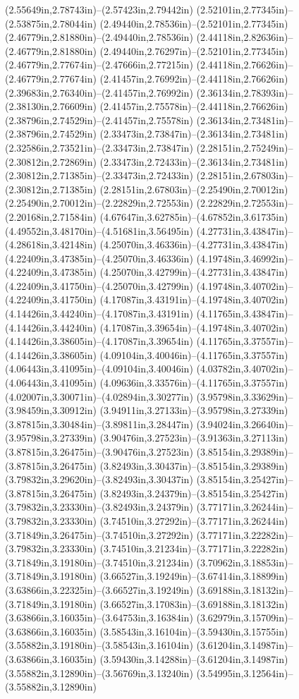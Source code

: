 (2.55649in,2.78743in)--(2.57423in,2.79442in) (2.52101in,2.77345in)--(2.53875in,2.78044in) (2.49440in,2.78536in)--(2.52101in,2.77345in) (2.46779in,2.81880in)--(2.49440in,2.78536in) (2.44118in,2.82636in)--(2.46779in,2.81880in) (2.49440in,2.76297in)--(2.52101in,2.77345in) (2.46779in,2.77674in)--(2.47666in,2.77215in) (2.44118in,2.76626in)--(2.46779in,2.77674in) (2.41457in,2.76992in)--(2.44118in,2.76626in) (2.39683in,2.76340in)--(2.41457in,2.76992in) (2.36134in,2.78393in)--(2.38130in,2.76609in) (2.41457in,2.75578in)--(2.44118in,2.76626in) (2.38796in,2.74529in)--(2.41457in,2.75578in) (2.36134in,2.73481in)--(2.38796in,2.74529in) (2.33473in,2.73847in)--(2.36134in,2.73481in) (2.32586in,2.73521in)--(2.33473in,2.73847in) (2.28151in,2.75249in)--(2.30812in,2.72869in) (2.33473in,2.72433in)--(2.36134in,2.73481in) (2.30812in,2.71385in)--(2.33473in,2.72433in) (2.28151in,2.67803in)--(2.30812in,2.71385in) (2.28151in,2.67803in)--(2.25490in,2.70012in) (2.25490in,2.70012in)--(2.22829in,2.72553in) (2.22829in,2.72553in)--(2.20168in,2.71584in) (4.67647in,3.62785in)--(4.67852in,3.61735in) (4.49552in,3.48170in)--(4.51681in,3.56495in) (4.27731in,3.43847in)--(4.28618in,3.42148in) (4.25070in,3.46336in)--(4.27731in,3.43847in) (4.22409in,3.47385in)--(4.25070in,3.46336in) (4.19748in,3.46992in)--(4.22409in,3.47385in) (4.25070in,3.42799in)--(4.27731in,3.43847in) (4.22409in,3.41750in)--(4.25070in,3.42799in) (4.19748in,3.40702in)--(4.22409in,3.41750in) (4.17087in,3.43191in)--(4.19748in,3.40702in) (4.14426in,3.44240in)--(4.17087in,3.43191in) (4.11765in,3.43847in)--(4.14426in,3.44240in) (4.17087in,3.39654in)--(4.19748in,3.40702in) (4.14426in,3.38605in)--(4.17087in,3.39654in) (4.11765in,3.37557in)--(4.14426in,3.38605in) (4.09104in,3.40046in)--(4.11765in,3.37557in) (4.06443in,3.41095in)--(4.09104in,3.40046in) (4.03782in,3.40702in)--(4.06443in,3.41095in) (4.09636in,3.33576in)--(4.11765in,3.37557in) (4.02007in,3.30071in)--(4.02894in,3.30277in) (3.95798in,3.33629in)--(3.98459in,3.30912in) (3.94911in,3.27133in)--(3.95798in,3.27339in) (3.87815in,3.30484in)--(3.89811in,3.28447in) (3.94024in,3.26640in)--(3.95798in,3.27339in) (3.90476in,3.27523in)--(3.91363in,3.27113in) (3.87815in,3.26475in)--(3.90476in,3.27523in) (3.85154in,3.29389in)--(3.87815in,3.26475in) (3.82493in,3.30437in)--(3.85154in,3.29389in) (3.79832in,3.29620in)--(3.82493in,3.30437in) (3.85154in,3.25427in)--(3.87815in,3.26475in) (3.82493in,3.24379in)--(3.85154in,3.25427in) (3.79832in,3.23330in)--(3.82493in,3.24379in) (3.77171in,3.26244in)--(3.79832in,3.23330in) (3.74510in,3.27292in)--(3.77171in,3.26244in) (3.71849in,3.26475in)--(3.74510in,3.27292in) (3.77171in,3.22282in)--(3.79832in,3.23330in) (3.74510in,3.21234in)--(3.77171in,3.22282in) (3.71849in,3.19180in)--(3.74510in,3.21234in) (3.70962in,3.18853in)--(3.71849in,3.19180in) (3.66527in,3.19249in)--(3.67414in,3.18899in) (3.63866in,3.22325in)--(3.66527in,3.19249in) (3.69188in,3.18132in)--(3.71849in,3.19180in) (3.66527in,3.17083in)--(3.69188in,3.18132in) (3.63866in,3.16035in)--(3.64753in,3.16384in) (3.62979in,3.15709in)--(3.63866in,3.16035in) (3.58543in,3.16104in)--(3.59430in,3.15755in) (3.55882in,3.19180in)--(3.58543in,3.16104in) (3.61204in,3.14987in)--(3.63866in,3.16035in) (3.59430in,3.14288in)--(3.61204in,3.14987in) (3.55882in,3.12890in)--(3.56769in,3.13240in) (3.54995in,3.12564in)--(3.55882in,3.12890in) 